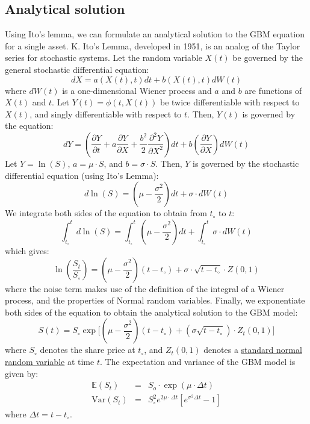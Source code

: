 \documentclass[11pt]{article}
\theoremstyle{definition}
\begin{document}
\subsection{Analytical solution}
Using Ito's lemma, we can formulate an analytical solution to the GBM equation for a single asset.
K. Ito's Lemma, developed in 1951, is an analog of the Taylor series for stochastic systems.
Let the random variable $X(t)$ be governed by the general stochastic differential equation:
\begin{equation*}
dX = a\left(X(t),t\right)dt + b\left(X(t),t\right)dW(t)
\end{equation*}
where $dW(t)$ is a one-dimensional Wiener process and $a$ and $b$ are functions of $X(t)$ and $t$. 
Let $Y(t) = \phi\left(t,X(t)\right)$ be twice differentiable with respect to $X(t)$, 
and singly differentiable with respect to $t$. Then, $Y(t)$ is governed by the equation:
\begin{equation*}
dY = \left(\frac{\partial{Y}}{\partial{t}}+a\frac{\partial{Y}}{\partial{X}}+\frac{b^{2}}{2}\frac{\partial^{2}{Y}}{\partial{X}^{2}}\right)dt+b\left(\frac{\partial{Y}}{\partial{X}}\right)dW(t)
\end{equation*}
Let $Y = \ln(S)$, $a = \mu\cdot{S}$, and $b = \sigma\cdot{S}$. 
Then, $Y$ is governed by the stochastic differential equation (using Ito's Lemma):
\begin{equation*}
d\ln(S) = \left(\mu - \frac{\sigma^{2}}{2}\right)dt + \sigma\cdot{dW(t)}
\end{equation*}
We integrate both sides of the equation to obtain from $t_{\circ}$ to $t$:
\begin{equation*}
\int_{t_{\circ}}^{t}d\ln(S) = \int_{t_{\circ}}^{t}\left(\mu - \frac{\sigma^{2}}{2}\right)dt + \int_{t_{\circ}}^{t}\sigma\cdot{dW(t)}
\end{equation*}
which gives:
\begin{equation*}
\ln\left(\frac{S_{t}}{S_{\circ}}\right) = \left(\mu - \frac{\sigma^{2}}{2}\right)\left(t - t_{\circ}\right) + \sigma\cdot\sqrt{t-t_{\circ}}\cdot{Z(0,1)}
\end{equation*}
where the noise term makes use of the definition of the integral of a Wiener process, and the properties of Normal random variables.
Finally, we exponentiate both sides of the equation to obtain the analytical solution to the GBM model:
\begin{equation}\label{eqn:analytical-soln-GBM}
S(t) = S_{\circ}\exp\Biggl[\left(\mu-\frac{\sigma^{2}}{2}\right)\left(t - t_{\circ}\right) + (\sigma\sqrt{t-t_{\circ}})\cdot{Z_{t}(0,1)}\Biggr]
\end{equation}
where $S_{\circ}$ denotes the share price at $t_{\circ}$, and $Z_{t}(0,1)$ denotes a 
\href{https://en.wikipedia.org/wiki/Normal_distribution#Standard_normal_distribution}{standard normal random variable} at time $t$.
The expectation and variance of the GBM model is given by:
\begin{eqnarray*}
\mathbb{E}\left(S_{t}\right) &=& S_{o}\cdot\exp\left(\mu\cdot\Delta{t}\right)\\
\text{Var}\left(S_{t}\right) &=& S_{\circ}^{2}e^{2\mu\cdot\Delta{t}}\left[e^{\sigma^{2}{\Delta{t}}} - 1\right]
\end{eqnarray*}
where $\Delta{t} = t - t_{\circ}$.
\end{document}
